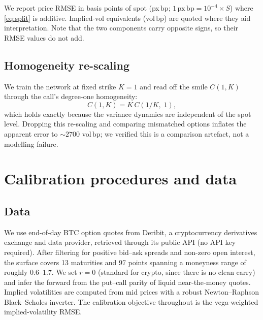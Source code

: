 \documentclass[review,12pt]{elsarticle}
\newcommand{\bp}{\ensuremath{\,\mathrm{bp}}}
\begin{document}
We report price RMSE in basis points of spot (px\bp; $1\,\mathrm{px\,bp} =
10^{-4}\times S$) where \eqref{eq:split} is additive.  Implied-vol equivalents
(vol\bp) are quoted where they aid interpretation.  Note that the two components
carry opposite signs, so their RMSE values do not add.

\subsection{Homogeneity re-scaling}
We train the network at fixed strike $K{=}1$ and read off the smile $C(1,K)$
through the call's degree-one homogeneity:
\begin{equation}
  C(1,K) = K\,C\!\left(1/K,\;1\right),
  \label{eq:homog}
\end{equation}
which holds exactly because the variance dynamics are independent of the spot
level.  Dropping this re-scaling and comparing mismatched options inflates the
apparent error to ${\sim}2700$ vol\bp; we verified this is a comparison artefact,
not a modelling failure.

\section{Calibration procedures and data}
\label{sec:calib}

\subsection{Data}
We use end-of-day BTC option quotes from Deribit, a cryptocurrency derivatives
exchange and data provider, retrieved through its public API (no API key required).
After filtering for positive bid--ask spreads and non-zero open interest, the
surface covers 13 maturities and 97 points spanning a moneyness range of roughly
$0.6$--$1.7$.  We set $r{=}0$ (standard for crypto, since there is no clean carry)
and infer the forward from the put--call parity of liquid near-the-money quotes.
Implied volatilities are computed from mid prices with a robust Newton--Raphson
Black--Scholes inverter.  The calibration objective throughout is the
vega-weighted implied-volatility RMSE.
\end{document}
